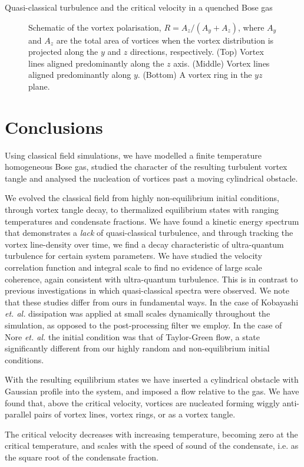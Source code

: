 \begin{chapter}{\label{cha:nonequib}Quasi-classical turbulence and the critical velocity in a quenched Bose gas}
\begin{figure}
\begin{tikzpicture}[scale=.7,x={(1cm,0cm)},y={(0,0)},z={(0cm,1cm)}]
\end{tikzpicture}
\caption{\label{fig:pol_R} Schematic of the vortex polarisation, $R=A_z/(A_y+A_z)$, where $A_y$ and $A_z$ are the total area of vortices when the vortex distribution is projected along the $y$ and $z$ directions, respectively.  (Top) Vortex lines aligned predominantly along the $z$ axis. (Middle) Vortex lines aligned predominantly along $y$. (Bottom) A vortex ring in the $yz$ plane.}
\end{figure}
\section{Conclusions\label{sec:conclusions}}

Using classical field simulations, we have modelled a finite temperature homogeneous Bose gas, 
studied the character of the resulting turbulent vortex tangle and analysed the nucleation
of vortices past a moving cylindrical obstacle.

We evolved the classical field from highly non-equilibrium initial conditions, through vortex tangle decay, to thermalized equilibrium states with ranging temperatures and condensate fractions. We have found a kinetic energy spectrum that demonstrates a {\it lack} of quasi-classical turbulence, and through tracking the vortex line-density over time, we find a decay characteristic of ultra-quantum turbulence for certain system parameters. We have studied the velocity correlation function and integral scale to find no evidence of large scale coherence, again consistent with ultra-quantum turbulence. This is in contrast to previous investigations \cite{Nore,Kobayashi} in which quasi-classical spectra were observed. We note that these studies differ from ours in fundamental ways. In the case of Kobayashi {\it et. al.} dissipation was applied at small scales dynamically throughout the simulation, as opposed to the post-processing filter we employ. In the case of Nore {\it et. al.} the initial condition was that of Taylor-Green flow, a state significantly different from our highly random and non-equilibrium initial conditions.

With the resulting equilibrium states we have inserted a cylindrical obstacle with Gaussian profile into the system, and imposed a flow relative to the gas.  We have found that, above the critical velocity, vortices are nucleated forming wiggly anti-parallel pairs of vortex lines, vortex rings, or as a vortex tangle.

The critical velocity decreases with increasing temperature, becoming zero at the critical temperature, and scales with the speed of sound of the condensate, i.e. as the square root of the condensate fraction.
\end{chapter}